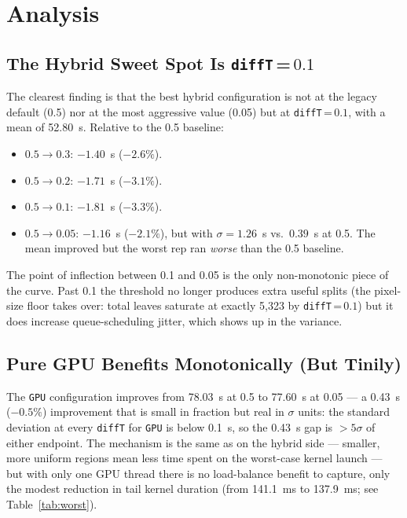 \documentclass[
	english,
	letterpaper, oneside
]{article}
\begin{document}
\section{Analysis}

\subsection{The Hybrid Sweet Spot Is \texttt{diffT}\,=\,$0.1$}

The clearest finding is that the best hybrid configuration is not at
the legacy default (0.5) nor at the most aggressive value (0.05) but at
\texttt{diffT}\,=\,$0.1$, with a mean of 52.80~s. Relative to the 0.5
baseline:

\begin{itemize}
    \item $0.5 \to 0.3$: $-1.40$~s ($-2.6\%$).
    \item $0.5 \to 0.2$: $-1.71$~s ($-3.1\%$).
    \item $0.5 \to 0.1$: $-1.81$~s ($-3.3\%$).
    \item $0.5 \to 0.05$: $-1.16$~s ($-2.1\%$), but with $\sigma=1.26$~s
    vs.\ $0.39$~s at 0.5. The mean improved but the worst rep ran
    \emph{worse} than the 0.5 baseline.
\end{itemize}

\noindent
The point of inflection between 0.1 and 0.05 is the only non-monotonic
piece of the curve. Past 0.1 the threshold no longer produces extra
useful splits (the pixel-size floor takes over: total leaves saturate
at exactly 5{,}323 by \texttt{diffT}\,=\,$0.1$) but it does increase
queue-scheduling jitter, which shows up in the variance.

\subsection{Pure GPU Benefits Monotonically (But Tinily)}

The \texttt{GPU} configuration improves from 78.03~s at 0.5 to 77.60~s
at 0.05 --- a 0.43~s ($-0.5\%$) improvement that is small in fraction
but real in $\sigma$ units: the standard deviation at every
\texttt{diffT} for \texttt{GPU} is below 0.1~s, so the 0.43~s gap is
$>5\sigma$ of either endpoint. The mechanism is the same as on the
hybrid side --- smaller, more uniform regions mean less time spent on
the worst-case kernel launch --- but with only one GPU thread there is
no load-balance benefit to capture, only the modest reduction in tail
kernel duration (from 141.1~ms to 137.9~ms; see
Table~\ref{tab:worst}).
\end{document}

